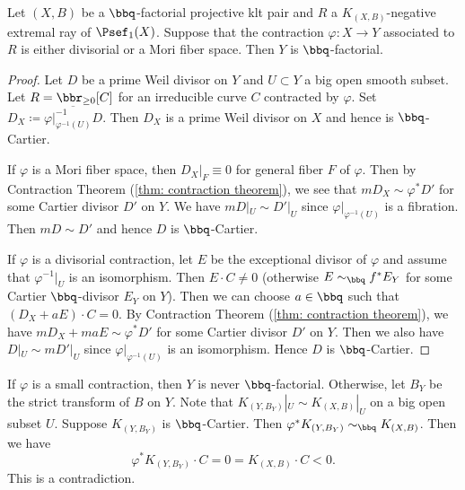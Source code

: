     \begin{proposition}\label{prop:divisorial_or_fibered_contraction_preverses_Q_factorial}
        Let \((X,B)\) be a \(\bbq\)-factorial projective klt pair and \(R\) a \(K_{(X,B)}\)-negative extremal ray of \(\Psef_1(X)\).
        Suppose that the contraction \(\varphi:X\to Y\) associated to \(R\) is either divisorial or a Mori fiber space. 
        Then \(Y\) is \(\bbq\)-factorial.
    \end{proposition}
    \begin{proof}
        Let \(D\) be a prime Weil divisor on \(Y\) and \(U \subset Y\) a big open smooth subset.
        Let \(R = \bbr_{\geq 0}[C]\) for an irreducible curve \(C\) contracted by \(\varphi\).
        Set \(D_X \coloneqq \overline{\varphi|_{\varphi^{-1}(U)}^{-1} D}\).
        Then \(D_X\) is a prime Weil divisor on \(X\) and hence is \(\bbq\)-Cartier.

        If \(\varphi\) is a Mori fiber space, then \(D_X|_F \equiv 0\) for general fiber \(F\) of \(\varphi\).
        Then by Contraction Theorem (\cref{thm: contraction theorem}), we see that \(mD_X \sim \varphi^* D'\) for some Cartier divisor \(D'\) on \(Y\).
        We have \(mD|_{U} \sim D'|_{U}\) since \(\varphi|_{\varphi^{-1}(U)}\) is a fibration.
        Then \(mD \sim D'\) and hence \(D\) is \(\bbq\)-Cartier.

        If \(\varphi\) is a divisorial contraction, let \(E\) be the exceptional divisor of \(\varphi\) and assume that \(\varphi^{-1}|_U\) is an isomorphism.
        Then \(E \cdot C \neq 0\) (otherwise \(E \sim_{\bbq} f^*E_Y\) for some Cartier \(\bbq\)-divisor \(E_Y\) on \(Y\)).
        Then we can choose \(a\in\bbq\) such that \((D_X + aE)\cdot C = 0\).
        By Contraction Theorem (\cref{thm: contraction theorem}), we have \(mD_X + maE \sim \varphi^* D'\) for some Cartier divisor \(D'\) on \(Y\).
        Then we also have \(D|_{U} \sim mD'|_{U}\) since \(\varphi|_{\varphi^{-1}(U)}\) is an isomorphism.
        Hence \(D\) is \(\bbq\)-Cartier.
    \end{proof}
    \begin{remark}\label{rmk:small_contraction_is_never_Q_factorial}
        If \(\varphi\) is a small contraction, then \(Y\) is never \(\bbq\)-factorial.
        Otherwise, let \(B_Y\) be the strict transform of \(B\) on \(Y\).
        Note that \(K_{(Y,B_Y)}|_U \sim K_{(X,B)}|_U\) on a big open subset \(U\).
        Suppose \(K_{(Y,B_Y)}\) is \(\bbq\)-Cartier.
        Then \(\varphi^*K_{(Y,B_Y)} \sim_\bbq K_{(X,B)}\).
        Then we have
        \[ \varphi^*K_{(Y,B_Y)}\cdot C = 0 = K_{(X,B)}\cdot C < 0. \]
        This is a contradiction.
    \end{remark}

    